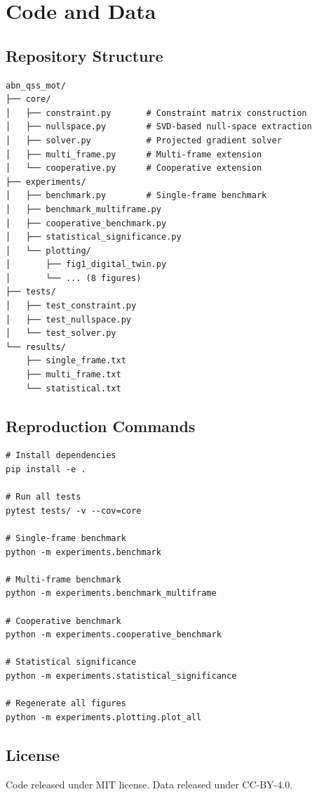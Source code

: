 \section{Code and Data}
\label{app:code}

\subsection{Repository Structure}

\begin{verbatim}
abn_qss_mot/
├── core/
│   ├── constraint.py       # Constraint matrix construction
│   ├── nullspace.py        # SVD-based null-space extraction
│   ├── solver.py           # Projected gradient solver
│   ├── multi_frame.py      # Multi-frame extension
│   └── cooperative.py      # Cooperative extension
├── experiments/
│   ├── benchmark.py        # Single-frame benchmark
│   ├── benchmark_multiframe.py
│   ├── cooperative_benchmark.py
│   ├── statistical_significance.py
│   └── plotting/
│       ├── fig1_digital_twin.py
│       └── ... (8 figures)
├── tests/
│   ├── test_constraint.py
│   ├── test_nullspace.py
│   └── test_solver.py
└── results/
    ├── single_frame.txt
    ├── multi_frame.txt
    └── statistical.txt
\end{verbatim}

\subsection{Reproduction Commands}

\begin{verbatim}
# Install dependencies
pip install -e .

# Run all tests
pytest tests/ -v --cov=core

# Single-frame benchmark
python -m experiments.benchmark

# Multi-frame benchmark
python -m experiments.benchmark_multiframe

# Cooperative benchmark
python -m experiments.cooperative_benchmark

# Statistical significance
python -m experiments.statistical_significance

# Regenerate all figures
python -m experiments.plotting.plot_all
\end{verbatim}

\subsection{License}

Code released under MIT license. Data released under CC-BY-4.0.